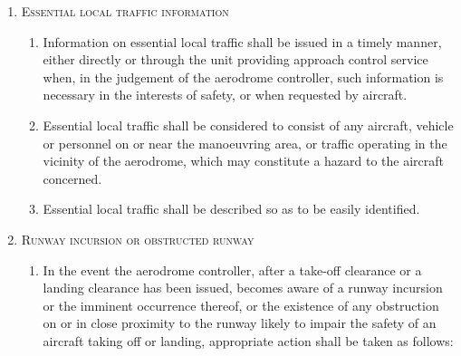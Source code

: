 \documentclass[../main.tex]{subfiles}
\begin{document}
\begin{enumerate}[itemsep=0.2cm]
\begin{enumerate}

        \end{enumerate}

        \item \textsc{Essential local traffic information}
        \begin{enumerate}
            \item Information on essential local traffic shall be issued in a timely manner, either directly or through the unit providing approach control service when, in the judgement of the aerodrome controller, such information is necessary in the interests of safety, or when requested by aircraft.
            \item Essential local traffic shall be considered to consist of any aircraft, vehicle or personnel on or near the manoeuvring area, or traffic operating in the vicinity of the aerodrome, which may constitute a hazard to the aircraft concerned.
            \item Essential local traffic shall be described so as to be easily identified.
        \end{enumerate}

        \item \textsc{Runway incursion or obstructed runway}
        \begin{enumerate}
            \item In the event the aerodrome controller, after a take-off clearance or a landing clearance has been issued, becomes aware of a runway incursion or the imminent occurrence thereof, or the existence of any obstruction on or in close proximity to the runway likely to impair the safety of an aircraft taking off or landing, appropriate action shall be taken as follows:


\end{enumerate}
\end{enumerate}
\end{document}
